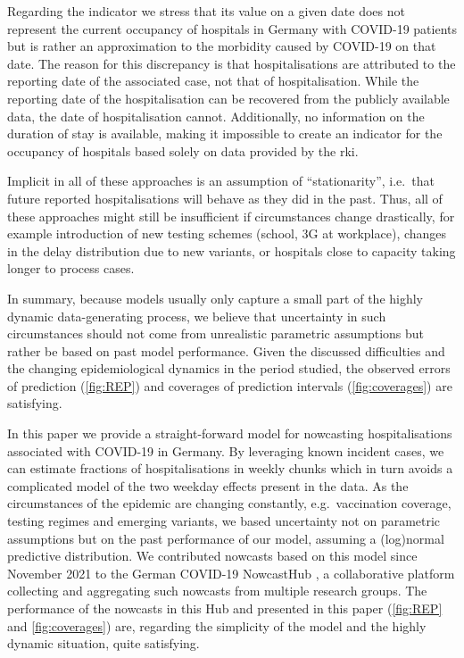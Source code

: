 Regarding the indicator we stress that its value on a given date does
not represent the current occupancy of hospitals in Germany with
COVID-19 patients but is rather an approximation to the morbidity caused
by COVID-19 on that date. The reason for this discrepancy is that
hospitalisations are attributed to the reporting date of the associated
case, not that of hospitalisation. While the reporting date of the
hospitalisation can be recovered from the publicly available data, the
date of hospitalisation cannot. Additionally, no information on the
duration of stay is available, making it impossible to create an
indicator for the occupancy of hospitals based solely on data provided
by the \gls{rki}.

Implicit in all of these approaches is an assumption of
``stationarity'', i.e.~that future reported hospitalisations will behave
as they did in the past. Thus, all of these approaches might still be
insufficient if circumstances change drastically, for example
introduction of new testing schemes (school, 3G at workplace), changes
in the delay distribution due to new variants, or hospitals close to
capacity taking longer to process cases.

In summary, because models usually only capture a small part of the
highly dynamic data-generating process, we believe that uncertainty in
such circumstances should not come from unrealistic parametric
assumptions but rather be based on past model performance. Given the
discussed difficulties and the changing epidemiological dynamics in the
period studied, the observed errors of prediction (\cref{fig:REP})
and coverages of prediction intervals (\cref{fig:coverages}) are
satisfying.

In this paper we provide a straight-forward model for nowcasting
hospitalisations associated with COVID-19 in Germany. By leveraging
known incident cases, we can estimate fractions of hospitalisations in
weekly chunks which in turn avoids a complicated model of the two
weekday effects present in the data. As the circumstances of the
epidemic are changing constantly, e.g.~vaccination coverage, testing
regimes and emerging variants, we based uncertainty not on parametric
assumptions but on the past performance of our model, assuming a
(log)normal predictive distribution. We contributed nowcasts based on
this model since November 2021 to the German COVID-19 NowcastHub
\cite{2022Nowcasts}, a collaborative platform collecting and
aggregating such nowcasts from multiple research groups. The performance
of the nowcasts in this Hub and presented in this paper (\cref{fig:REP} and \cref{fig:coverages}) are, regarding the simplicity of
the model and the highly dynamic situation, quite satisfying.

